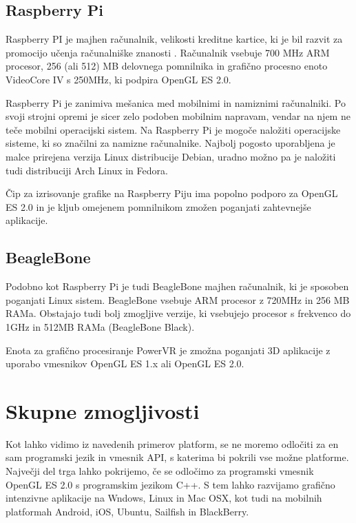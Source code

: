 \subsection{Raspberry Pi}
\label{sec:raspberryPi}

Raspberry PI je majhen računalnik, velikosti kreditne kartice, ki je bil razvit za promocijo učenja računalniške znanosti \cite{rasPi}. Računalnik vsebuje 700 MHz ARM procesor, 256 (ali 512) MB delovnega pomnilnika in grafično procesno enoto VideoCore IV s 250MHz, ki podpira OpenGL ES 2.0.

Raspberry Pi je zanimiva mešanica med mobilnimi in namiznimi računalniki. Po svoji strojni opremi je sicer zelo podoben mobilnim napravam, vendar na njem ne teče mobilni operacijski sistem. Na Raspberry Pi je mogoče naložiti operacijske sisteme, ki so značilni za namizne računalnike. Najbolj pogosto uporabljena je malce prirejena verzija Linux distribucije Debian, uradno možno pa je naložiti tudi distribuciji Arch Linux in Fedora.

Čip za izrisovanje grafike na Raspberry Piju ima popolno podporo za OpenGL ES 2.0 in je kljub omejenem pomnilnikom zmožen poganjati zahtevnejše aplikacije.

\subsection{BeagleBone}
\label{sec:beagleBone}

Podobno kot Raspberry Pi je tudi BeagleBone \cite{beagleBone} majhen računalnik, ki je sposoben poganjati Linux sistem. BeagleBone vsebuje ARM procesor z 720MHz in 256 MB RAMa. Obstajajo tudi bolj zmogljive verzije, ki vsebujejo procesor s frekvenco do 1GHz in 512MB RAMa (BeagleBone Black). 

Enota za grafično procesiranje PowerVR je zmožna poganjati 3D aplikacije z uporabo vmesnikov OpenGL ES 1.x ali OpenGL ES 2.0.

\section{Skupne zmogljivosti}

Kot lahko vidimo iz navedenih primerov platform, se ne moremo odločiti za en sam programski jezik in vmesnik API, s katerima bi pokrili vse možne platforme. Največji del trga lahko pokrijemo, če se odločimo za programski vmesnik OpenGL ES 2.0 s programskim jezikom C++. S  tem lahko razvijamo grafično intenzivne aplikacije na Wndows, Linux in Mac OSX, kot tudi na mobilnih platformah Android, iOS, Ubuntu, Sailfish in BlackBerry.

